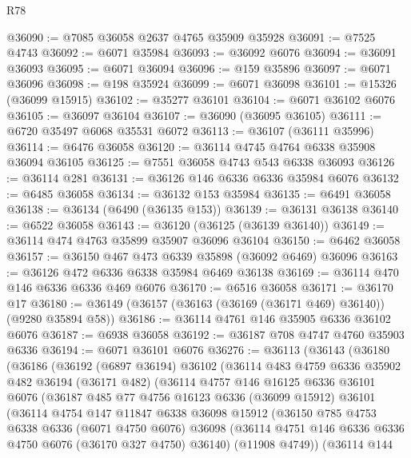 \begin{lexlean}{R78}
\begin{coremodule}
@36090 := @7085 @36058 @2637 @4765 @35909 @35928
@36091 := @7525 @4743
@36092 := @6071 @35984
@36093 := @36092 @6076
@36094 := @36091 @36093
@36095 := @6071 @36094
@36096 := @159 @35896
@36097 := @6071 @36096
@36098 := @198 @35924
@36099 := @6071 @36098
@36101 := @15326 (@36099 @15915)
@36102 := @35277 @36101
@36104 := @6071 @36102 @6076
@36105 := @36097 @36104
@36107 := @36090 (@36095 @36105)
@36111 := @6720 @35497 @6068 @35531 @6072
@36113 := @36107 (@36111 @35996)
@36114 := @6476 @36058
@36120 := @36114 @4745 @4764 @6338 @35908 @36094 @36105
@36125 := @7551 @36058 @4743 @543 @6338 @36093
@36126 := @36114 @281
@36131 := @36126 @146 @6336 @6336 @35984 @6076
@36132 := @6485 @36058
@36134 := @36132 @153 @35984
@36135 := @6491 @36058
@36138 := @36134 (@6490 (@36135 @153))
@36139 := @36131 @36138
@36140 := @6522 @36058
@36143 := @36120 (@36125 (@36139 @36140))
@36149 := @36114 @474 @4763 @35899 @35907 @36096 @36104
@36150 := @6462 @36058
@36157 := @36150 @467 @473 @6339 @35898 (@36092 @6469) @36096
@36163 := @36126 @472 @6336 @6338 @35984 @6469 @36138
@36169 := @36114 @470 @146 @6336 @6336 @469 @6076
@36170 := @6516 @36058
@36171 := @36170 @17
@36180 := @36149 (@36157 (@36163 (@36169 (@36171 @469) @36140)) (@9280 @35894 @58))
@36186 := @36114 @4761 @146 @35905 @6336 @36102 @6076
@36187 := @6938 @36058
@36192 := @36187 @708 @4747 @4760 @35903 @6336
@36194 := @6071 @36101 @6076
@36276 := @36113
    (@36143
      (@36180
        (@36186
          (@36192
            (@6897 @36194)
            @36102
            (@36114
              @483
              @4759
              @6336
              @35902
              @482
              @36194
              (@36171 @482)
              (@36114
                @4757
                @146
                @16125
                @6336
                @36101
                @6076
                (@36187
                  @485
                  @77
                  @4756
                  @16123
                  @6336
                  (@36099 @15912)
                  @36101
                  (@36114
                    @4754
                    @147
                    @11847
                    @6338
                    @36098
                    @15912
                    (@36150
                      @785
                      @4753
                      @6338
                      @6336
                      (@6071 @4750 @6076)
                      @36098
                      (@36114 @4751 @146 @6336 @6336 @4750 @6076 (@36170 @327 @4750) @36140)
                      (@11908 @4749))
                    (@36114
                      @144

\end{coremodule}
\end{lexlean}
